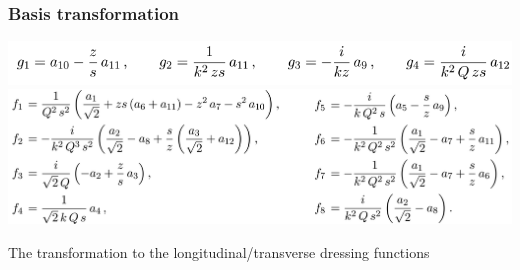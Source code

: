 \begin{frame}
    \frametitle{Basis transformation}
    \begin{minipage}[r]{1.\textwidth}
        \hspace{2mm}
        \includegraphics[scale=0.8]{graphics/gs}
        \vspace{4mm}
        \includegraphics[scale=0.7]{graphics/fs}
    \end{minipage}

    \small The transformation to the longitudinal/transverse dressing functions

    \vspace{3mm}
\end{frame}

\endinput
